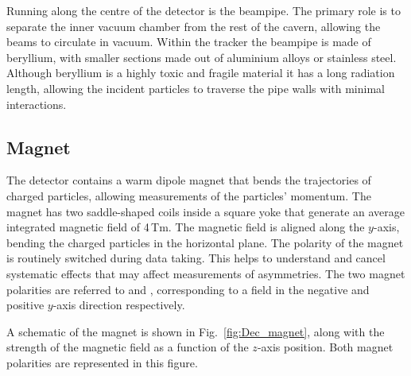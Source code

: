 Running along the centre of the detector is the \lhcb beampipe. The primary role is to separate the inner vacuum chamber from the rest of the cavern, allowing the beams to circulate in vacuum. Within the \lhcb tracker the beampipe is made of beryllium, with smaller sections made out of aluminium alloys or stainless steel. Although beryllium is a highly toxic and fragile material it has a long radiation length, allowing the incident particles to traverse the pipe walls with minimal interactions.  


\subsection{Magnet}

The \lhcb detector contains a warm dipole magnet that bends the trajectories of charged particles, allowing measurements of the particles' momentum. The magnet has two saddle-shaped coils inside a square yoke that generate an average integrated magnetic field of 4\,Tm.  
The magnetic field is aligned along the $y$-axis, bending the charged particles in the horizontal plane. The polarity of the magnet is routinely switched during data taking. This helps to understand and cancel systematic effects that may affect measurements of \CP asymmetries. The two magnet polarities are referred to \MagDown and \MagUp, corresponding to a field in the negative and positive $y$-axis direction respectively.   

A schematic of the magnet is shown in Fig.~\ref{fig:Dec_magnet}, along with the strength of the magnetic field as a function of the $z$-axis position. Both magnet polarities are represented in this figure. 


